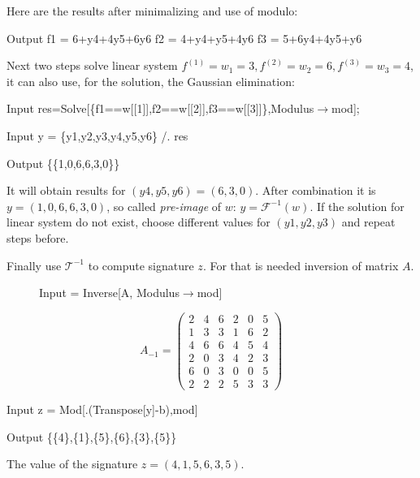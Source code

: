 \documentclass[thesis=M,english]{FITthesis}[2019/12/23]
\begin{document}
Here are the results after minimalizing and use of modulo:
\begin{mmaCell}{Output}
  f1 = 6+y4+4y5+6y6
  f2 = 4+y4+y5+4y6
  f3 = 5+6y4+4y5+y6
\end{mmaCell}
Next two steps solve linear system $f^{(1)} = w_1 = 3, f^{(2)} = w_2 = 6, f^{(3)} = w_3 = 4$, it can also use, for the solution, the Gaussian elimination:
\begin{mmaCell}[moredefined={res, f1, w, f2, f3, mod}]{Input}
  res=Solve[\{f1==w[[1]],f2==w[[2]],f3==w[[3]]\},Modulus\(\pmb{\to}\)mod];
\end{mmaCell}
\begin{mmaCell}[moredefined={y, y1, y2, y3, res}]{Input}
  y = \{y1,y2,y3,y4,y5,y6\} /. res 
\end{mmaCell}
\begin{mmaCell}{Output}
  \{\{1,0,6,6,3,0\}\}
\end{mmaCell}
It will obtain results for $(y4,y5,y6) = (6,3,0)$. After combination it is $y = (1,0,6,6,3,0)$, so called \textit{pre-image} of $w$: $y =  \mathcal{F}^{-1}(w)$. If the solution for linear system do not exist, choose different values for $(y1,y2,y3)$ and repeat steps before.

\bigskip
\noindent
Finally use $\mathcal{T}^{-1}$ to compute signature $z$. For that is needed inversion of matrix $A$.
\begin{figure}[h]
	\begin{minipage}{0.59\textwidth}
		\centering
\begin{mmaCell}[moredefined={A, mod}]{Input}
   = Inverse[A, Modulus\(\pmb{\to}\)mod]
\end{mmaCell}
	\end{minipage}
	\begin{minipage}{0.28\textwidth}
		\centering
		\begin{equation*}
A_{-1} = 
\begin{pmatrix}
2 & 4 & 6 & 2 & 0 & 5 \\
1 & 3 & 3 & 1 & 6 & 2 \\
4 & 6 & 6 & 4 & 5 & 4 \\
2 & 0 & 3 & 4 & 2 & 3 \\
6 & 0 & 3 & 0 & 0 & 5 \\
2 & 2 & 2 & 5 & 3 & 3
\end{pmatrix}
\end{equation*}
	\end{minipage}
\end{figure}
\begin{mmaCell}[moredefined={z, A, y, b, mod}]{Input}
  z = Mod[.(Transpose[y]-b),mod] 
\end{mmaCell}
\begin{mmaCell}{Output}
  \{\{4\},\{1\},\{5\},\{6\},\{3\},\{5\}\}
\end{mmaCell}
The value of the signature $z = (4,1,5,6,3,5)$.
\end{document}
